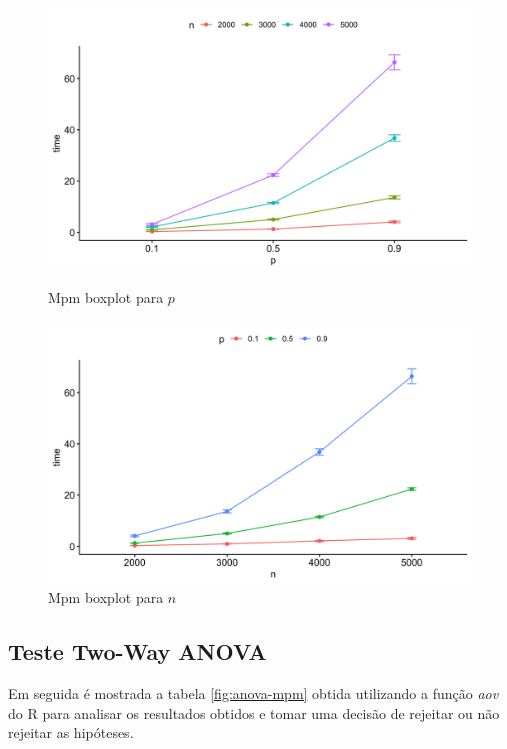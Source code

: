 \documentclass{uofa-eng-assignment}
\begin{document}
\begin{figure}[h]
    \begin{minipage}{0.45\textwidth}
        \centering
        \includegraphics[width=1\linewidth]{mpm_intplot1.png}
        \caption{Mpm boxplot para $p$}
        \label{fig:intplot-mpm-n}
    \end{minipage}\hfill
    \begin{minipage}{0.45\textwidth}
        \centering
        \includegraphics[width=1\linewidth]{mpm_intplot2.png}
        \caption{Mpm boxplot para $n$}
        \label{fig:intplot-mpm-p}
    \end{minipage}
\end{figure}

\subsection{Teste Two-Way ANOVA}

Em seguida é mostrada a tabela \ref{fig:anova-mpm} obtida utilizando a função \emph{aov} do R para analisar os resultados obtidos e tomar uma decisão de rejeitar ou não rejeitar as hipóteses.
\end{document}
